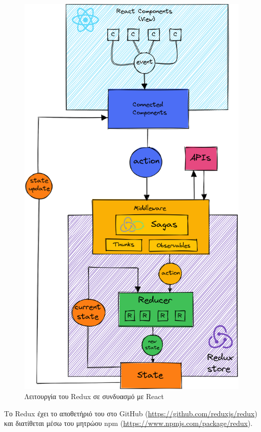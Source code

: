 \begin{figure}[H]
	\centering
	\includegraphics[width=.75\textwidth]{assets/figures/chapter-4/4.3.react-redux}
	\caption{Λειτουργία του Redux σε συνδυασμό με React}
\end{figure}

Το Redux έχει το αποθετήριό του στο GitHub (\url{https://github.com/reduxjs/redux}) και διατίθεται μέσω του μητρώου npm (\url{https://www.npmjs.com/package/redux}).
